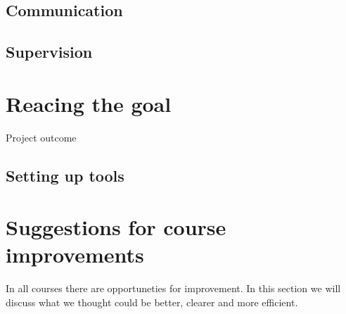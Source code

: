 \subsection{Communication}
\subsection{Supervision}


\section{Reacing the goal}
Project outcome
\subsection{Setting up tools}


\section{Suggestions for course improvements}
In all courses there are opportuneties for improvement. In this section we will discuss what we thought could be better, clearer and more efficient.
